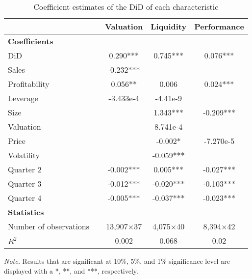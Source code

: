 \documentclass[a4paper,11pt]{report}
\begin{document}
\begin{table}[h]
\centering

\caption{Coefficient estimates of the DiD of each characteristic}
\label{tab:did}
\setlength{\tabcolsep}{15pt} %
\begin{tabular}{llccc}
\toprule
& & \textbf{Valuation} & \textbf{Liquidity} & \textbf{Performance} \\
\midrule

\textbf{Coefficients} & & & & \\
\midrule
\multicolumn{1}{l|}{DiD} & & 0.290***      &   0.745***         &  0.076***          \\
[1ex]
\multicolumn{1}{l|}{Sales} & & -0.232***       &            &            \\
[1ex]
\multicolumn{1}{l|}{Profitability} & & 0.056**      & 0.006     & 0.024*** \\
[1ex]
\multicolumn{1}{l|}{Leverage} & & -3.433e-4     &   -4.41e-9         &            \\
[1ex]
\multicolumn{1}{l|}{Size} & &            & 1.343***   & -0.209***   \\
[1ex]
\multicolumn{1}{l|}{Valuation} & &            & 8.741e-4   &            \\
[1ex]
\multicolumn{1}{l|}{Price} & &            & -0.002* &    -7.270e-5        \\
[1ex]
\multicolumn{1}{l|}{Volatility} & &            & -0.059***  &            \\
[1ex]
\multicolumn{1}{l|}{Quarter 2} & & -0.002***   &  0.005***   & -0.027***   \\
[0.5ex]
\multicolumn{1}{l|}{Quarter 3} & & -0.012***  & -0.020***  & -0.103***   \\
[0.5ex]
\multicolumn{1}{l|}{Quarter 4} & & -0.005***   & -0.037***  & -0.023***   \\
\midrule
\textbf{Statistics} & & & & \\
\midrule
\multicolumn{1}{l|}{Number of observations} & & 13,907$\times$37 & 4,075$\times$40 & 8,394$\times$42 \\
\multicolumn{1}{l|}{$R^2$} & & 0.002 & 0.068 & 0.02 \\
\bottomrule
\end{tabular}

\vspace{0.25cm}
{\scriptsize \textit{Note.} Results that are significant at 10\%, 5\%, and 1\% significance level are displayed with a *, **, and ***, respectively. \par}
\end{table}
\end{document}
